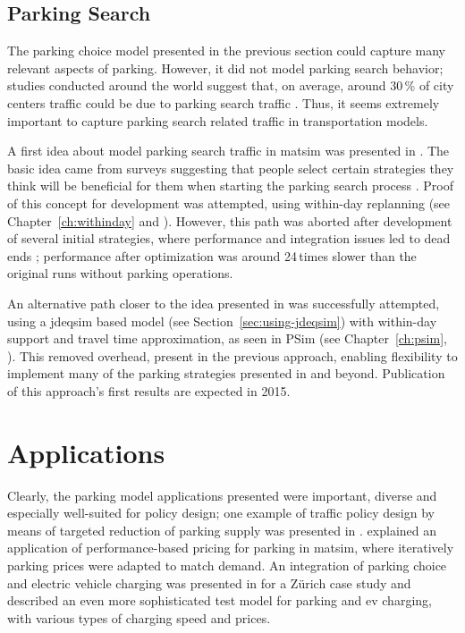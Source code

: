 \subsection{Parking Search}
The parking choice model presented in the previous section could capture many relevant aspects of parking. However, it did not model parking search behavior;  studies conducted around the world suggest that, on average, around 30\,\% of city centers traffic could be due to parking search traffic \citet[][]{Shoup_RSUE_2004}. Thus, it seems extremely important to capture parking search related traffic in transportation models.

A first idea about model parking search traffic in \gls{matsim} was presented in \citet[][]{Waraich_unpub_IATBR_2012}. The basic idea came from surveys suggesting that people select certain strategies they think will be beneficial for them when starting the parking search process \citet[][]{AxhausenPolak_1989}. Proof of this concept for development was attempted, using within-day replanning (see Chapter~\ref{ch:withinday} and \citep[][]{DoblerEtAl_TRR_2012}). However, this path was aborted after development of several initial strategies, where performance and integration issues led to dead ends \citet[][]{WaraichEtAl_unpub_TRB_2013}; performance after optimization was around 24\,times slower than the original runs without parking operations. 

An alternative path closer to the idea presented in \citet[][]{Waraich_unpub_IATBR_2012} was successfully attempted, using a \gls{jdeqsim} based model (see Section~\ref{sec:using-jdeqsim}) with within-day support and travel time approximation, as seen in PSim (see Chapter~\ref{ch:psim}, \citet[][]{FourieEtAl_TRR_2013}). This removed overhead, present in the previous approach, enabling flexibility to implement many of the parking strategies presented in \citet[][]{AxhausenPolak_1989} and beyond. Publication of this approach's first results are expected in 2015.

\section{Applications}
Clearly, the parking model applications presented were important, diverse  and especially well-suited for policy design; one example of traffic policy design by means of targeted reduction of parking supply was presented in \citet[][]{WaraichAxhausen_TRR_2012}. \citet[][]{WaraichEtAl_unpub_TRB_2013} explained an application of performance-based pricing for parking in \gls{matsim}, where iteratively parking prices were adapted to match demand. An integration of parking choice and electric vehicle charging was presented in \citet[][]{WaraichEtAl_JanssensEtAl_2014} for a Zürich case study and \citet[][]{BemetzHohenfellner_BSCThesis_2014} described an even more sophisticated test model for parking and \gls{ev} charging, with various types of charging speed and prices.

